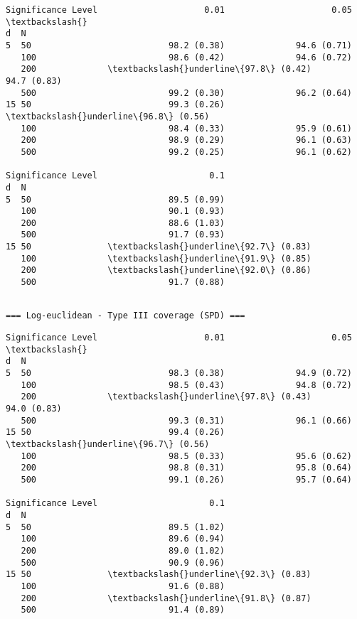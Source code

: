 \documentclass[11pt]{article}
\begin{document}
    
    \begin{Verbatim}[commandchars=\\\{\}]
Significance Level                     0.01                     0.05  \textbackslash{}
d  N                                                                   
5  50                           98.2 (0.38)              94.6 (0.71)   
   100                          98.6 (0.42)              94.6 (0.72)   
   200              \textbackslash{}underline\{97.8\} (0.42)              94.7 (0.83)   
   500                          99.2 (0.30)              96.2 (0.64)   
15 50                           99.3 (0.26)  \textbackslash{}underline\{96.8\} (0.56)   
   100                          98.4 (0.33)              95.9 (0.61)   
   200                          98.9 (0.29)              96.1 (0.63)   
   500                          99.2 (0.25)              96.1 (0.62)   

Significance Level                      0.1  
d  N                                         
5  50                           89.5 (0.99)  
   100                          90.1 (0.93)  
   200                          88.6 (1.03)  
   500                          91.7 (0.93)  
15 50               \textbackslash{}underline\{92.7\} (0.83)  
   100              \textbackslash{}underline\{91.9\} (0.85)  
   200              \textbackslash{}underline\{92.0\} (0.86)  
   500                          91.7 (0.88)  
    \end{Verbatim}

    
    \begin{Verbatim}[commandchars=\\\{\}]

=== Log-euclidean - Type III coverage (SPD) ===
    \end{Verbatim}

    
    \begin{Verbatim}[commandchars=\\\{\}]
Significance Level                     0.01                     0.05  \textbackslash{}
d  N                                                                   
5  50                           98.3 (0.38)              94.9 (0.72)   
   100                          98.5 (0.43)              94.8 (0.72)   
   200              \textbackslash{}underline\{97.8\} (0.43)              94.0 (0.83)   
   500                          99.3 (0.31)              96.1 (0.66)   
15 50                           99.4 (0.26)  \textbackslash{}underline\{96.7\} (0.56)   
   100                          98.5 (0.33)              95.6 (0.62)   
   200                          98.8 (0.31)              95.8 (0.64)   
   500                          99.1 (0.26)              95.7 (0.64)   

Significance Level                      0.1  
d  N                                         
5  50                           89.5 (1.02)  
   100                          89.6 (0.94)  
   200                          89.0 (1.02)  
   500                          90.9 (0.96)  
15 50               \textbackslash{}underline\{92.3\} (0.83)  
   100                          91.6 (0.88)  
   200              \textbackslash{}underline\{91.8\} (0.87)  
   500                          91.4 (0.89)  
    \end{Verbatim}
\end{document}
